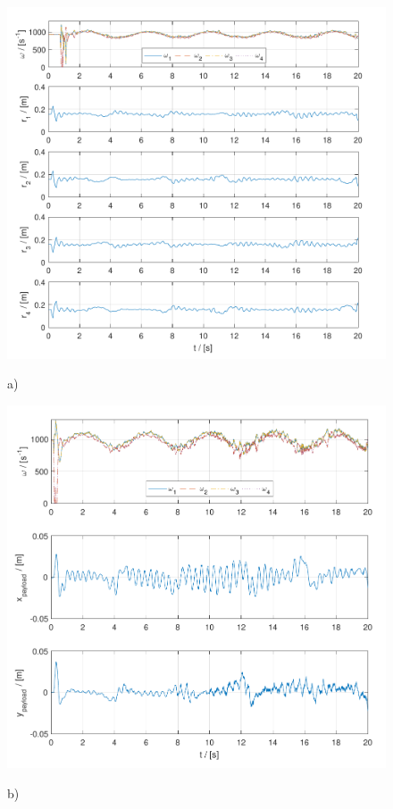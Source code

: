 \begin{figure}
	\centering
	\begin{minipage}{0.5\columnwidth}
		\centering
		\includegraphics[width=\columnwidth]{./pictures/mmcuav_control_inputs.pdf}
		\caption*{a)}
		\label{fig:mmcuav_control}
	\end{minipage}%
	\begin{minipage}{0.5\columnwidth}
		\centering
		\includegraphics[width=\columnwidth]{./pictures/mmuav_control_inputs.pdf}
		\caption*{b)}
		\label{fig:mmuav_control}
	\end{minipage}
	\caption{}
\end{figure}


